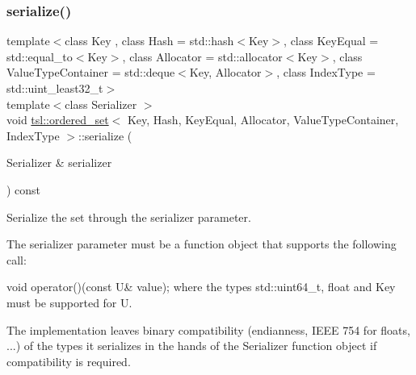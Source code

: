 \subsubsection{\texorpdfstring{serialize()}{serialize()}}
{\footnotesize\ttfamily template$<$class Key , class Hash  = std\+::hash$<$\+Key$>$, class Key\+Equal  = std\+::equal\+\_\+to$<$\+Key$>$, class Allocator  = std\+::allocator$<$\+Key$>$, class Value\+Type\+Container  = std\+::deque$<$\+Key, Allocator$>$, class Index\+Type  = std\+::uint\+\_\+least32\+\_\+t$>$ \\
template$<$class Serializer $>$ \\
void \mbox{\hyperlink{classtsl_1_1ordered__set}{tsl\+::ordered\+\_\+set}}$<$ Key, Hash, Key\+Equal, Allocator, Value\+Type\+Container, Index\+Type $>$\+::serialize (\begin{DoxyParamCaption}\item[{Serializer \&}]{serializer }\end{DoxyParamCaption}) const\hspace{0.3cm}{\ttfamily [inline]}}

Serialize the set through the {\ttfamily serializer} parameter.

The {\ttfamily serializer} parameter must be a function object that supports the following call\+:
\begin{DoxyItemize}
\item {\ttfamily void operator()(const U\& value);} where the types {\ttfamily std\+::uint64\+\_\+t}, {\ttfamily float} and {\ttfamily Key} must be supported for U.
\end{DoxyItemize}

The implementation leaves binary compatibility (endianness, I\+E\+EE 754 for floats, ...) of the types it serializes in the hands of the {\ttfamily Serializer} function object if compatibility is required. \mbox{\label{classtsl_1_1ordered__set_a96fc16543a99e892512b9119375c0fe5}} 
